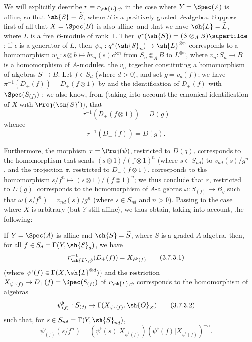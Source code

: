 \begin{env}[3.7.2]
\label{II.3.7.2}
We will explicitly describe $r=r_{\sh{L},\psi}$ in the case where $Y=\Spec(A)$ is affine, so that $\sh{S}=\widetilde{S}$, where $S$ is a positively graded $A$-algebra.
Suppose first of all that $X=\Spec(B)$ is also affine, and that we have $\sh{L}=\widetilde{L}$, where $L$ is a free $B$-module of rank~$1$.
Then $q^*(\sh{S})=(S\otimes_A B)\supertilde$ ;
if $c$ is a generator of $L$, then $\psi_n:q^*(\sh{S}_n)\to\sh{L}^{\otimes n}$ corresponds to a homomorphism $w_n:s\otimes b\mapsto bv_n(s)c^{\otimes n}$ from $S_n\otimes_A B$ to $L^{\otimes n}$, where $v_n:S_n\to B$ is a homomorphism of $A$-modules, the $v_n$ together constituting a homomorphism of algebras $S\to B$.
Let $f\in S_d$ (where $d>0$), and set $g=v_d(f)$;
we have $\pi^{-1}(D_+(f))=D_+(f\otimes1)$ by  and the identification of $D_+(f)$ with $\Spec(S_{(f)})$ ;
we also know, from  (taking into account the canonical identification of $X$ with $\Proj(\sh{S}')$), that
\[
  \tau^{-1}(D_+(f\otimes1)) = D(g)
\]
whence
\[
\label{II.3.7.2.1}
  r^{-1}(D_+(f)) = D(g).
\tag{3.7.2.1}
\]

Furthermore, the morphism $\tau=\Proj(\psi)$, restricted to $D(g)$, corresponds to the homomorphism that sends $(s\otimes1)/(f\otimes1)^n$ (where $s\in S_{nd}$) to $v_{nd}(s)/g^n$ , and the projection $\pi$, restricted to $D_+(f\otimes1)$, corresponds to the homomorphism $s/f^n\mapsto(s\otimes1)/(f\otimes1)^n$;
we thus conclude that $r$, restricted to $D(g)$, corresponds to the homomorphism of $A$-algebras $\omega:S_{(f)}\to B_g$ such that $\omega(s/f^n)=v_{nd}(s)/g^n$ (where $s\in S_{nd}$ and $n>0$).
Passing to the case where $X$ is arbitrary (but $Y$ still affine), we thus obtain, taking  into account, the following:
\end{env}

\begin{proposition}[3.7.3]
\label{II.3.7.3}
If $Y=\Spec(A)$ is affine and $\sh{S}=\widetilde{S}$, where $S$ is a graded $A$-algebra, then, for all $f\in S_d=\Gamma(Y,\sh{S}_d)$, we have
\[
\label{II.3.7.3.1}
  r_{\sh{L},\psi}^{-1}(D_+(f)) = X_{\psi^\flat(f)}
\tag{3.7.3.1}
\]
(where $\psi^\flat(f)\in\Gamma(X,\sh{L}^{\otimes d})$) and the restriction $X_{\psi^\flat(f)}\to D_+(f)=\Spec(S_{(f)})$ of $r_{\sh{L},\psi}$ corresponds  to the homomorphism of algebras
\[
\label{II.3.7.3.2}
  \psi_{(f)}^\flat : S_{(f)} \to \Gamma(X_{\psi^\flat(f)},\sh{O}_X)
\tag{3.7.3.2}
\]
such that, for $s\in S_{nd}=\Gamma(Y,\sh{S}_{nd})$,
\[
\label{II.3.7.3.3}
  \psi_{(f)}^\flat(s/f^n) = (\psi^\flat(s)|X_{\psi^\flat(f)})(\psi^\flat(f)|X_{\psi^\flat(f)})^{-n}.
\tag{3.7.3.3}
\]
\end{proposition}


